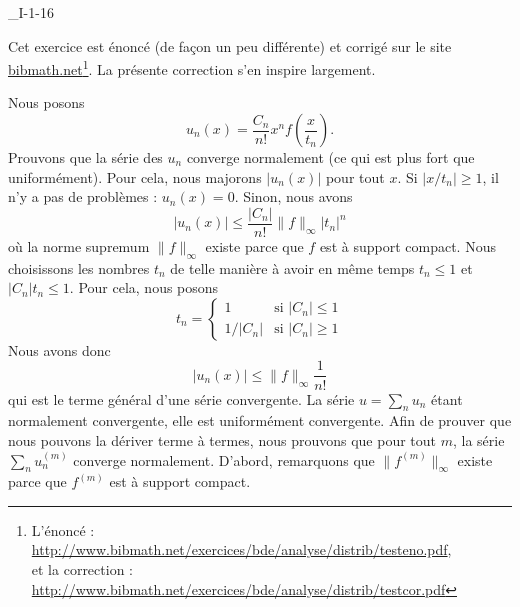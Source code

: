 

\begin{corrige}{_I-1-16}

Cet exercice est énoncé (de façon un peu différente) et corrigé sur le site \href{http://www.bibmath.net}{bibmath.net}\footnote{L'énoncé : \href{http://www.bibmath.net/exercices/bde/analyse/distrib/testeno.pdf}{http://www.bibmath.net/exercices/bde/analyse/distrib/testeno.pdf},\\ et la correction : \href{http://www.bibmath.net/exercices/bde/analyse/distrib/testcor.pdf}{http://www.bibmath.net/exercices/bde/analyse/distrib/testcor.pdf}}. La présente correction s'en inspire largement.

Nous posons
\begin{equation}
	u_n(x)=\frac{ C_n }{ n! }x^nf(\frac{ x }{ t_n }).
\end{equation}
Prouvons que la série des $u_n$ converge normalement (ce qui est plus fort que uniformément). Pour cela, nous majorons $| u_n(x) |$ pour tout $x$. Si $| x/t_n |\geq 1$, il n'y a pas de problèmes : $u_n(x)=0$. Sinon, nous avons
\begin{equation}		\label{EqMajorationBorel16}
	| u_n(x) |\leq\frac{ | C_n | }{ n! }\| f \|_{\infty}| t_n |^n
\end{equation}
où la norme supremum $\| f \|_{\infty}$ existe parce que $f$ est à support compact. Nous choisissons les nombres $t_n$ de telle manière à avoir en même temps $t_n\leq 1$ et $| C_n |t_n\leq 1$. Pour cela, nous posons
\begin{equation}
	t_n=\begin{cases}
	1	&	\text{si }|C_n|\leq 1\\
	1/|C_n|	&	 \text{si }| C_n |\geq 1
\end{cases}
\end{equation}
Nous avons donc
\begin{equation}
	| u_n(x) |\leq \| f \|_{\infty}\frac{1}{ n! }
\end{equation}
qui est le terme général d'une série convergente. La série $u=\sum_n u_n$ étant normalement convergente, elle est uniformément convergente. Afin de prouver que nous pouvons la dériver terme à termes, nous prouvons que pour tout $m$, la série $\sum_n u_n^{(m)}$ converge normalement. D'abord, remarquons que $\| f^{(m)} \|_{\infty}$ existe parce que $f^{(m)}$ est à support compact.


\end{corrige}
